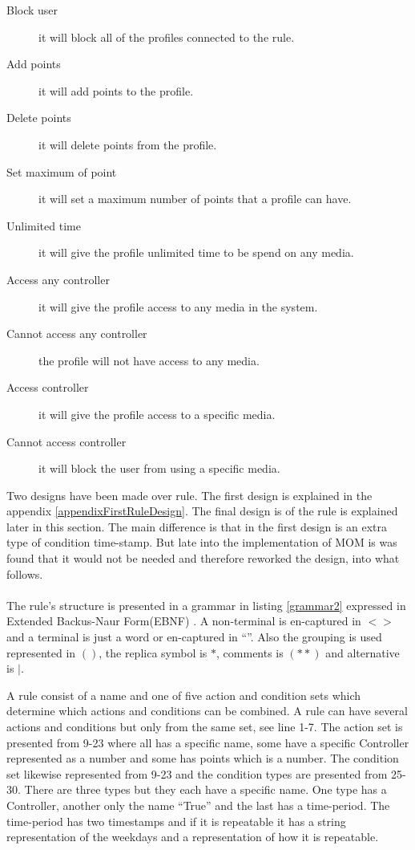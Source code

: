 \begin{description}
	\item[Block user] it will block all of the profiles connected to the rule. 
	\item[Add points] it will add points to the profile.
	\item[Delete points]  it will delete points from the profile.  
	\item[Set maximum of point] it will set a maximum number of points that a profile can have. 
	\item[Unlimited time] it will give the profile unlimited time to be spend on any media. 
	\item[Access any controller] it will give the profile access to any media in the system. 
	\item[Cannot access any controller] the profile will not have access to any media. 
	\item[Access controller] it will give the profile access to a specific media. 
	\item[Cannot access controller] it will block the user from using a specific media. 
\end{description}
Two designs have been made over rule. The first design is explained in the appendix \vref{appendixFirstRuleDesign}. The final design is of the rule is explained later in this section. The main difference is that in the first design is an extra type of condition time-stamp. But late into the implementation of MOM is was found that it would not be needed and therefore reworked the design, into what follows.\\
\\
The rule's structure is presented in a grammar in listing	\ref{grammar2} expressed in Extended Backus-Naur Form(EBNF) \citep{CoPL}.
A non-terminal is en-captured in $<>$ and a terminal is just a word or en-captured in ``''. 
Also the grouping is used represented in $()$, the replica symbol is $*$, comments is $(**)$ and alternative is $|$. 

A rule consist of a name and one of five action and condition sets which determine which actions and conditions can be combined. A rule can have several actions and conditions but only from the same set, see line 1-7. The action set is presented from 9-23 where all has a specific name, some have a specific Controller represented as a number and some has points which is a number. The condition set likewise represented from 9-23 and the condition types are presented from 25-30. There are three types but they each have a specific name. One type has a Controller, another only the name ``True'' and the last has a time-period. The time-period has two timestamps and if it is repeatable it has a string representation of the weekdays and a representation of how it is repeatable. 

